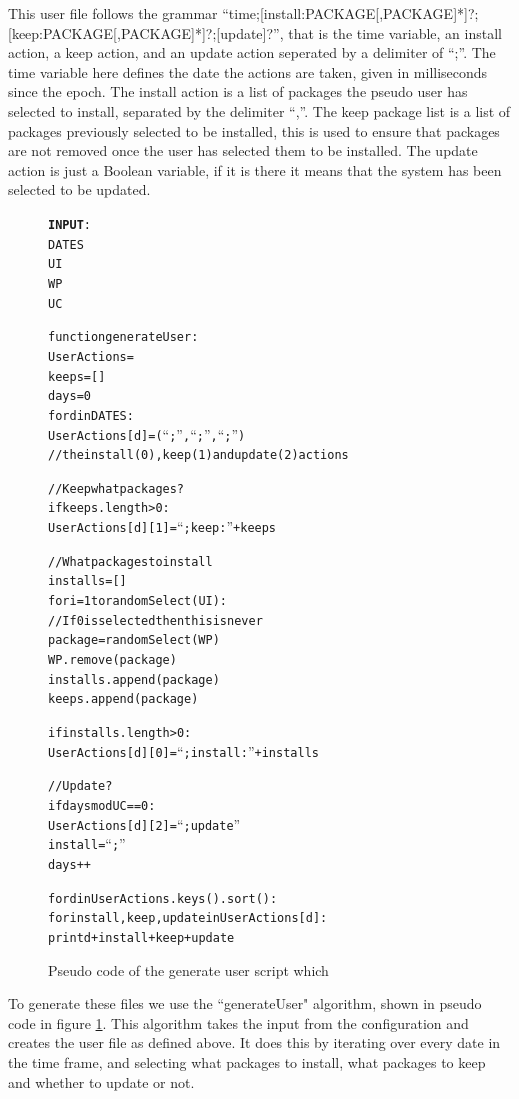 This user file follows the grammar ``time;[install:PACKAGE[,PACKAGE]*]?;[keep:PACKAGE[,PACKAGE]*]?;[update]?'',
that is the time variable, an install action, a keep action, and an update action seperated by a delimiter of ``;''.
The time variable here defines the date the actions are taken, given in milliseconds since the epoch.
The install action is a list of packages the pseudo user has selected to install, separated by the delimiter ``,''. 
The keep package list is a list of packages previously selected to be installed, this is used to ensure that packages are not removed once the user has selected them to be installed.
The update action is just a Boolean variable, if it is there it means that the system has been selected to be updated.



\begin{figure}[htp]
\begin{center}
\begin{alltt}
\textbf{INPUT}:
DATES
UI
WP
UC

function generateUser: 
    UserActions = {}
    keeps = []
    days = 0
    for d in DATES:
        UserActions[d] = (``;'', ``;'', ``;'') 
        //the install(0), keep(1) and update(2) actions
        
        //Keep what packages?
        if keeps.length > 0:
            UserActions[d][1] = ``;keep:'' + keeps 
            
        //What packages to install
        installs = []
        for i = 1 to randomSelect(UI):
            //If 0 is selected then this is never
            package = randomSelect(WP)
            WP.remove(package)
            installs.append(package)
            keeps.append(package)
            
        if installs.length > 0:
            UserActions[d][0] = ``;install:'' + installs 
        
        //Update?
        if days mod UC == 0:
            UserActions[d][2] = ``;update''
        install = ``;''
        days++
        
for d in UserActions.keys().sort():
    for install,keep,update in UserActions[d]:
        print d + install + keep + update
\end{alltt}
\caption[generateUser script]{Pseudo code of the generate user script which}
\label{generateuser}
\end{center}
\end{figure}

To generate these files we use the ``generateUser" algorithm, shown in pseudo code in figure \ref{generateuser}.
This algorithm takes the input from the configuration and creates the user file as defined above.
It does this by iterating over every date in the time frame, and selecting what packages to install,
what packages to keep and whether to update or not.

